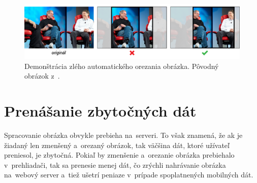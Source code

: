 \begin{figure}[!ht]
	\centering
	\includegraphics[width=\textwidth]{jobs_gates}
	\caption{Demonštrácia zlého automatického orezania obrázka. Pôvodný obrázok z~\cite{Jobs_Gates_piture}.}
	\label{fig:jg_image}
\end{figure}


\section{Prenášanie zbytočných dát}

Spracovanie obrázka obvykle prebieha na~serveri. To však znamená, že ak je žiadaný len zmenšený a~orezaný obrázok, tak väčšina dát, ktoré užívateľ preniesol, je zbytočná. Pokiaľ by zmenšenie a~orezanie obrázka prebiehalo v~prehliadači, tak sa prenesie menej dát, čo zrýchli nahrávanie obrázka na~webový server a~tiež ušetrí peniaze v~prípade spoplatnených mobilných dát.

